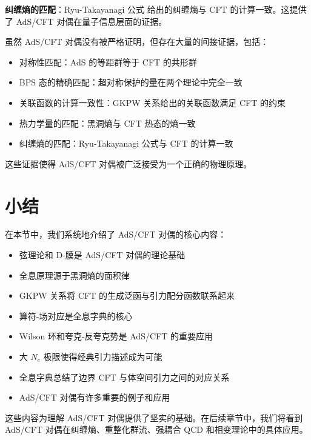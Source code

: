 \textbf{纠缠熵的匹配}：Ryu-Takayanagi 公式 \cite{Ryu2006} 给出的纠缠熵与 CFT 的计算一致。这提供了 AdS/CFT 对偶在量子信息层面的证据。

\begin{note}
虽然 AdS/CFT 对偶没有被严格证明，但存在大量的间接证据，包括：
\begin{itemize}
    \item 对称性匹配：AdS 的等距群等于 CFT 的共形群
    \item BPS 态的精确匹配：超对称保护的量在两个理论中完全一致
    \item 关联函数的计算一致性：GKPW 关系给出的关联函数满足 CFT 的约束
    \item 热力学量的匹配：黑洞熵与 CFT 热态的熵一致
    \item 纠缠熵的匹配：Ryu-Takayanagi 公式与 CFT 的计算一致
\end{itemize}
这些证据使得 AdS/CFT 对偶被广泛接受为一个正确的物理原理。
\end{note}

\section{小结}

在本节中，我们系统地介绍了 AdS/CFT 对偶的核心内容：
\begin{itemize}
    \item 弦理论和 D-膜是 AdS/CFT 对偶的理论基础
    \item 全息原理源于黑洞熵的面积律
    \item GKPW 关系将 CFT 的生成泛函与引力配分函数联系起来
    \item 算符-场对应是全息字典的核心
    \item Wilson 环和夸克-反夸克势是 AdS/CFT 的重要应用
    \item 大 $N_c$ 极限使得经典引力描述成为可能
    \item 全息字典总结了边界 CFT 与体空间引力之间的对应关系
    \item AdS/CFT 对偶有许多重要的例子和应用
\end{itemize}
这些内容为理解 AdS/CFT 对偶提供了坚实的基础。在后续章节中，我们将看到 AdS/CFT 对偶在纠缠熵、重整化群流、强耦合 QCD 和相变理论中的具体应用。

